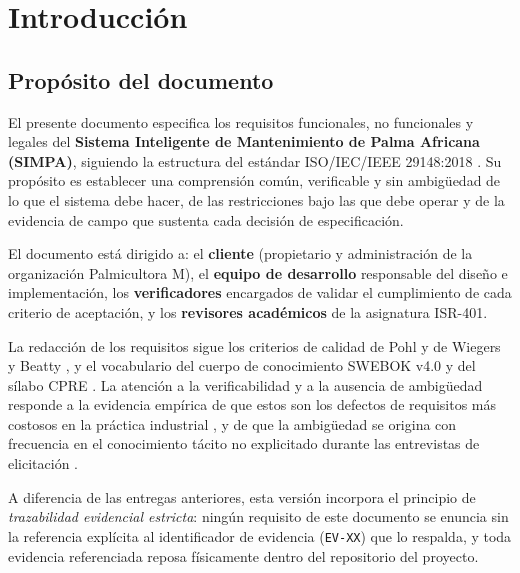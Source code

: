 \documentclass[11pt,a4paper]{article}
\newcommand{\id}[1]{\texttt{\begingroup\hyphenpenalty=10000\relax#1\endgroup}}
\renewcommand{\id}[1]{\texttt{#1}}
\begin{document}
\newpage
\tableofcontents
\newpage
\listoffigures
\listoftables
\newpage

\section{Introducción}

\subsection{Propósito del documento}

El presente documento especifica los requisitos funcionales, no funcionales y legales del
\textbf{Sistema Inteligente de Mantenimiento de Palma Africana (SIMPA)}, siguiendo la estructura
del estándar ISO/IEC/IEEE 29148:2018 \cite{iso29148}. Su propósito es establecer una comprensión
común, verificable y sin ambigüedad de lo que el sistema debe hacer, de las restricciones bajo las
que debe operar y de la evidencia de campo que sustenta cada decisión de especificación.

El documento está dirigido a: el \textbf{cliente} (propietario y administración de la organización
Palmicultora M), el \textbf{equipo de desarrollo} responsable del diseño e implementación, los
\textbf{verificadores} encargados de validar el cumplimiento de cada criterio de aceptación, y los
\textbf{revisores académicos} de la asignatura ISR-401.

La redacción de los requisitos sigue los criterios de calidad de Pohl \cite{pohl2010} y de Wiegers y
Beatty \cite{wiegers2013}, y el vocabulario del cuerpo de conocimiento SWEBOK v4.0 \cite{swebok4} y
del sílabo CPRE \cite{ireb2023}. La atención a la verificabilidad y a la ausencia de ambigüedad
responde a la evidencia empírica de que estos son los defectos de requisitos más costosos en la
práctica industrial \cite{mendez2017,montgomery2022}, y de que la ambigüedad se origina con
frecuencia en el conocimiento tácito no explicitado durante las entrevistas de elicitación
\cite{ferrari2016}.

A diferencia de las entregas anteriores, esta versión incorpora el principio de \emph{trazabilidad
evidencial estricta}: ningún requisito de este documento se enuncia sin la referencia explícita al
identificador de evidencia (\id{EV-XX}) que lo respalda, y toda evidencia referenciada reposa
físicamente dentro del repositorio del proyecto.
\end{document}
